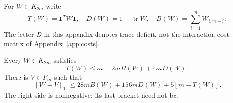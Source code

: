 For $W\in K_{2m}$ write
\[
 T(W)=\mathbf1^TW\mathbf1,\quad D(W)=1-\operatorname{tr}W,
 \quad B(W)=\sum_{i=1}^mW_{i,m+i}.
\]
The letter $D$ in this appendix denotes trace deficit, not the
interaction-cost matrix of Appendix~\ref{app:costs}.

\begin{lemma}\label{app:face-rounding}
Every $W\in K_{2m}$ satisfies
\begin{equation}
 T(W)\le m+2mB(W)+4mD(W).\label{app:exposure}
\end{equation}
There is $V\in F_m$ such that
\begin{equation}
 \|W-V\|_1\le28mB(W)+156mD(W)+5[m-T(W)].
 \label{app:face-distance}
\end{equation}
The right side is nonnegative; its last bracket need not be.
\end{lemma}
